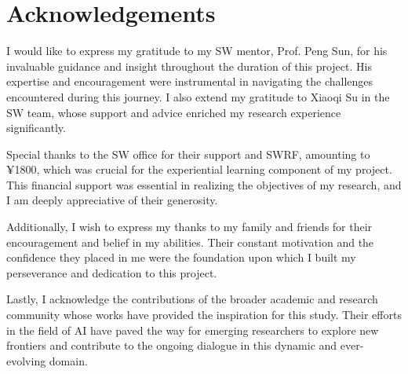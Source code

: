 \documentclass[11pt,a4paper,oneside]{report}
\begin{document}

\chapter*{Acknowledgements}
\label{acknowledgements}

I would like to express my gratitude to my SW mentor, Prof. Peng Sun, 
for his invaluable guidance and insight throughout the duration of this project.
His expertise and encouragement were instrumental in navigating the challenges encountered during this journey. 
I also extend my gratitude to Xiaoqi Su in the SW team, whose support and advice enriched my research experience significantly.

Special thanks to the SW office for their support and SWRF, amounting to ¥1800, which was crucial for the experiential learning component of my project. 
This financial support was essential in realizing the objectives of my research, and I am deeply appreciative of their generosity.

Additionally, I wish to express my thanks to my family and friends for their encouragement and belief in my abilities. 
Their constant motivation and the confidence they placed in me were the foundation upon which I built my perseverance and dedication to this project.

Lastly, I acknowledge the contributions of the broader academic and research community whose works have provided the inspiration for this study. 
Their efforts in the field of AI have paved the way for emerging researchers to explore new frontiers and contribute to the ongoing dialogue in this dynamic and ever-evolving domain.


\newpage


\setcounter{tocdepth}{1}
\listoffigures\newpage


\end{document}
